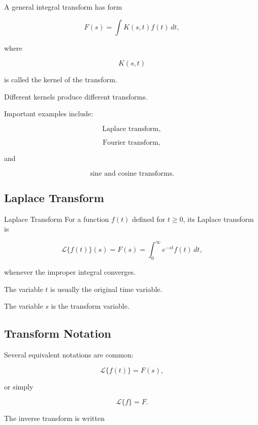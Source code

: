 A general integral transform has form

\[
\boxed{
F(s)
=
\int
K(s,t)f(t)\,dt,
}
\]

where

\[
K(s,t)
\]

is called the kernel of the transform.

Different kernels produce different transforms.

Important examples include:

\[
\boxed{
\text{Laplace transform},
}
\]

\[
\boxed{
\text{Fourier transform},
}
\]

and

\[
\boxed{
\text{sine and cosine transforms}.
}
\]

\subsection{Laplace Transform}
\label{subsec:laplace-transform}

\begin{definitionbox}{Laplace Transform}
For a function \(f(t)\) defined for \(t\geq0\), its Laplace transform is

\[
\boxed{
\mathcal{L}\{f(t)\}(s)
=
F(s)
=
\int_0^\infty
e^{-st}f(t)\,dt,
}
\]

whenever the improper integral converges.
\end{definitionbox}

The variable \(t\) is usually the original time variable.

The variable \(s\) is the transform variable.

\subsection{Transform Notation}
\label{subsec:laplace-transform-notation}

Several equivalent notations are common:

\[
\boxed{
\mathcal{L}\{f(t)\}
=
F(s),
}
\]

or simply

\[
\boxed{
\mathcal{L}\{f\}
=
F.
}
\]

The inverse transform is written

